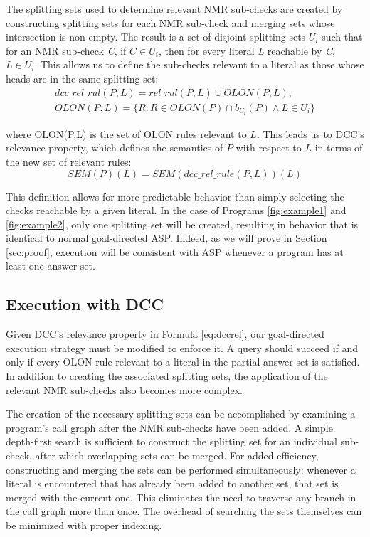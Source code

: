 \documentclass{new_tlp}
\begin{document}
The splitting sets used to determine relevant NMR sub-checks are created by 
constructing splitting sets for each NMR sub-check and merging sets whose 
intersection is non-empty. The result is a set of disjoint splitting sets 
$U_{i}$ such that for an NMR sub-check \textit{C}, if $C \in U_{i}$, then for 
every literal \textit{L} reachable by \textit{C}, $L \in U_{i}$. This allows us 
to define the sub-checks relevant to a literal as those whose heads are in the 
same splitting set:
\begin{equation}
\label{eq:dccrelrule}
\begin{aligned}
dcc\_rel\_rul(P,L) = rel\_rul(P,L) \cup OLON(P,L),\\
OLON(P,L) =
	\lbrace \mbox{$R: R \in OLON(P) \cap b_{U_i}(P) \wedge L \in U_i$} \rbrace
\end{aligned}
\end{equation}

\noindent where OLON(P,L) is the set of OLON rules relevant to $L$. This leads
us to DCC's relevance property, which defines the semantics of $P$ with respect
to $L$ in terms of the new set of relevant rules:
\begin{equation}
\label{eq:dccrel}
SEM(P)(L) = SEM(dcc\_rel\_rule(P,L))(L)
\end{equation}

This definition allows for more predictable behavior than simply selecting the 
checks reachable by a given literal. In the case of Programs \ref{fig:example1} 
and \ref{fig:example2}, only one splitting set will be created, resulting in 
behavior that is identical to normal goal-directed ASP. Indeed, as we will 
prove in Section \ref{sec:proof}, execution will be consistent with ASP 
whenever a program has at least one answer set.


\subsection{Execution with DCC}

Given DCC's relevance property in Formula \ref{eq:dccrel}, our goal-directed 
execution strategy must be modified to enforce it. A query should succeed if and
only if every OLON rule relevant to a literal in the partial answer set is
satisfied. In addition to creating the associated splitting sets, the
application of the relevant NMR sub-checks also becomes more complex.

The creation of the necessary splitting sets can be accomplished by examining a 
program's call graph after the NMR sub-checks have been added. A simple 
depth-first search is sufficient to construct the splitting set for an
individual sub-check, after which overlapping sets can be merged. For added
efficiency, constructing and merging the sets can be performed simultaneously:
whenever a literal is encountered that has already been added to another set,
that set is merged with the current one. This eliminates the need to traverse
any branch in the call graph more than once. The overhead of searching the sets
themselves can be minimized with proper indexing.
\end{document}
